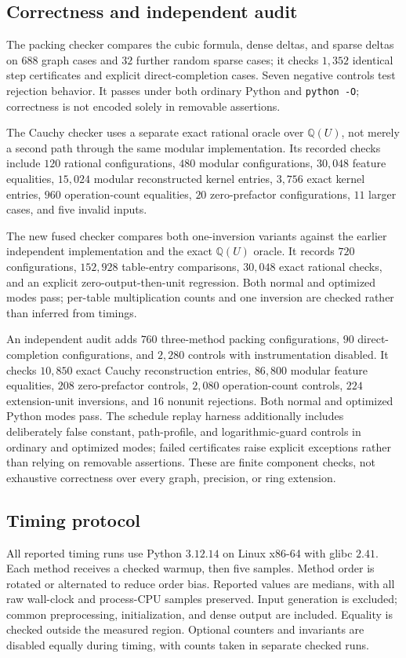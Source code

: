 \documentclass[11pt,letterpaper]{article}
\theoremstyle{remark}\newtheorem{remark}[theorem]{Remark}
\begin{document}
\subsection{Correctness and independent audit}
The packing checker compares the cubic formula, dense deltas, and sparse deltas on $688$ graph cases and $32$ further random sparse cases; it checks $1{,}352$ identical step certificates and explicit direct-completion cases. Seven negative controls test rejection behavior. It passes under both ordinary Python and \texttt{python -O}; correctness is not encoded solely in removable assertions.

The Cauchy checker uses a separate exact rational oracle over $\mathbb Q(U)$, not merely a second path through the same modular implementation. Its recorded checks include $120$ rational configurations, $480$ modular configurations, $30{,}048$ feature equalities, $15{,}024$ modular reconstructed kernel entries, $3{,}756$ exact kernel entries, $960$ operation-count equalities, $20$ zero-prefactor configurations, $11$ larger cases, and five invalid inputs.

The new fused checker compares both one-inversion variants against the earlier independent implementation and the exact $\mathbb Q(U)$ oracle. It records $720$ configurations, $152{,}928$ table-entry comparisons, $30{,}048$ exact rational checks, and an explicit zero-output-then-unit regression. Both normal and optimized modes pass; per-table multiplication counts and one inversion are checked rather than inferred from timings.

An independent audit adds $760$ three-method packing configurations, $90$ direct-completion configurations, and $2{,}280$ controls with instrumentation disabled. It checks $10{,}850$ exact Cauchy reconstruction entries, $86{,}800$ modular feature equalities, $208$ zero-prefactor controls, $2{,}080$ operation-count controls, $224$ extension-unit inversions, and $16$ nonunit rejections. Both normal and optimized Python modes pass. The schedule replay harness additionally includes deliberately false constant, path-profile, and logarithmic-guard controls in ordinary and optimized modes; failed certificates raise explicit exceptions rather than relying on removable assertions. These are finite component checks, not exhaustive correctness over every graph, precision, or ring extension.

\subsection{Timing protocol}
All reported timing runs use Python $3.12.14$ on Linux x86-64 with glibc $2.41$. Each method receives a checked warmup, then five samples. Method order is rotated or alternated to reduce order bias. Reported values are medians, with all raw wall-clock and process-CPU samples preserved. Input generation is excluded; common preprocessing, initialization, and dense output are included. Equality is checked outside the measured region. Optional counters and invariants are disabled equally during timing, with counts taken in separate checked runs.
\end{document}
